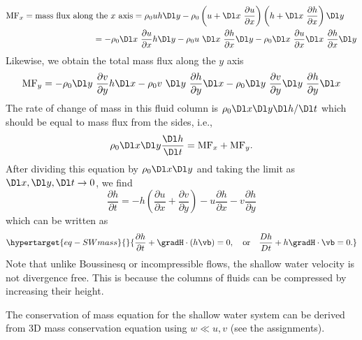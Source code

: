 \documentclass[
  letterpaper,
  twocolumn,
  landscape]{report}
\begin{document}
\begin{align*}
 \text{MF}_x = \text{mass flux along} &\text{ the $x$ axis} = \rho_0 u h \Dl y - \rho_0 \left( u + \Dl x \ \frac{\partial u}{\partial x} \right)  \left(h + \Dl x \ \frac{\partial h}{\partial x} \right) \Dl y \\
   &= -\rho_0 \Dl x \ \frac{\partial u}{\partial x}  h \Dl y
    -\rho_0 u \ \Dl x \  \frac{\partial h}{\partial x}   \Dl y  
    -\rho_0 \Dl x \ \frac{\partial u}{\partial x} \Dl x \ \frac{\partial h}{\partial x}  \Dl y 
    \end{align*} Likewise, we obtain the total mass flux along the \(y\)
axis \[        \text{MF}_y 
    = -\rho_0 \Dl y \ \frac{\partial v}{\partial y}  h \Dl x
    -\rho_0 v \ \Dl y \  \frac{\partial h}{\partial y}   \Dl x
    -\rho_0 \Dl y \ \frac{\partial v}{\partial y} \Dl y \ \frac{\partial h}{\partial y}  \Dl x 
\] The rate of change of mass in this fluid column is
\(\rho_0 \Dl x \Dl y \Dl h / \Dl t\) which should be equal to mass flux
from the sides, i.e., \[
    \rho_0 \Dl x \Dl y  \frac{\Dl h }{\Dl t } =  \text{MF}_x +  \text{MF}_y. 
\] After dividing this equation by \(\rho_0 \Dl x \Dl y\) and taking the
limit as \(\Dl x, \Dl y, \Dl t \to 0\), we find \[
    \frac{\partial h}{\partial t} = - h \left( \frac{\partial u}{\partial x} +\frac{\partial v}{\partial y} \right) - u  \frac{\partial h}{\partial x} - v  \frac{\partial h}{\partial y} 
\] which can be written as
\begin{equation}\protect\hypertarget{eq-SWmass}{}{
    \frac{\partial h}{\partial t} + \gradH \cdot (h \vb)=0, \quad \text{or} \quad  \frac{D h}{D t} + h \gradH \cdot \vb=0.
}\label{eq-SWmass}\end{equation} Note that unlike Boussinesq or
incompressible flows, the shallow water velocity is not divergence free.
This is because the columns of fluids can be compressed by increasing
their height.

\begin{tcolorbox}[enhanced jigsaw, toprule=.15mm, left=2mm, opacityback=0, breakable, arc=.35mm, colback=white, rightrule=.15mm, bottomrule=.15mm, colframe=quarto-callout-note-color-frame, leftrule=.75mm]
\begin{minipage}[t]{5.5mm}
\textcolor{quarto-callout-note-color}{\faInfo}
\end{minipage}%
\begin{minipage}[t]{\textwidth - 5.5mm}

The conservation of mass equation for the shallow water system can be
derived from 3D mass conservation equation using \(w \ll u, v\) (see the
assignments).

\end{minipage}%
\end{tcolorbox}
\end{document}
